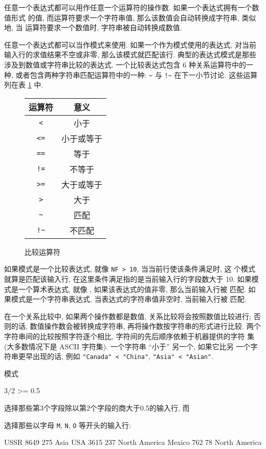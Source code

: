 任意一个表达式都可以用作任意一个运算符的操作数.
如果一个表达式拥有一个数值形式%
%
的值, 而运算符要求一个字符串值, 那么该数值会自动转换成字符串, 类似地, 当
运算符要求一个数值时, 字符串被自动转换成数值.

任意一个表达式都可以当作模式来使用. 如果一个作为模式使用的表达式, 对当前
输入行的求值结果不空或非零, 那么该模式就匹配该行. 典型的表达式模式是那些
涉及到数值或字符串比较的表达式. 一个比较表达式包含 6 种关系运算符中的一种,
或者包含两种字符串匹配运算符中的一种: \verb'~' 与 \verb'!~' 在下一小节讨论.
这些运算列在表 \ref{tbl:comparison_operators} 中.
\begin{figure}[ht]
\captionsetup{type=table}
\caption{比较运算符}
\label{tbl:comparison_operators}
\begin{center}
\begin{tabular}{c|c}
    \hline
    \hline
    运算符      & 意义 \\
    \hline
    \verb'<'    & 小于 \\
    \verb'<='   & 小于或等于 \\
    \verb'=='   & 等于  \\
    \verb'!='   & 不等于 \\
    \verb'>='   & 大于或等于 \\
    \verb'>'    & 大于  \\
    \verb'~'    & 匹配 \\
    \verb'!~'   & 不匹配 \\
    \hline
\end{tabular}
\end{center}
\end{figure}

如果模式是一个比较表达式, 就像 \verb'NF > 10', 当当前行使该条件满足时, 这
个模式就算是匹配该输入行, 在这里条件满足指的是当前输入行的字段数大于 10.
如果模式是一个算术表达式, 就像 \nf, 如果该表达式的值非零, 那么当前输入行被
匹配. 如果模式是一个字符串表达式, 当表达式的字符串值非空时, 当前输入行被
匹配.

在一个关系比较中, 如果两个操作数都是数值, 关系比较将会按照数值比较进行;
否则的话, 数值操作数会被转换成字符串, 再将操作数按字符串的形式进行比较.
两个字符串间的比较按照字符逐个相比, 字符间的先后顺序依赖于机器提供的字符
集 (大多数情况下是 ASCII 字符集). 一个字符串 ``小于'' 另一个, 如果它比另
一个字符串更早出现的话, 例如 \verb'"Canada" < "China"',
\verb'"Asia" < "Asian"'.

模式
\begin{awkcode}
    $3/$2 >= 0.5
\end{awkcode}
选择那些第3个字段除以第2个字段的商大于0.5的输入行, 而
选择那些以字母 \verb'M', \verb'N', \verb'O' 等开头的输入行:
\begin{file}
    USSR        8649    275     Asia
    USA 3615    237     North America
    Mexico      762     78      North America
\end{file}

